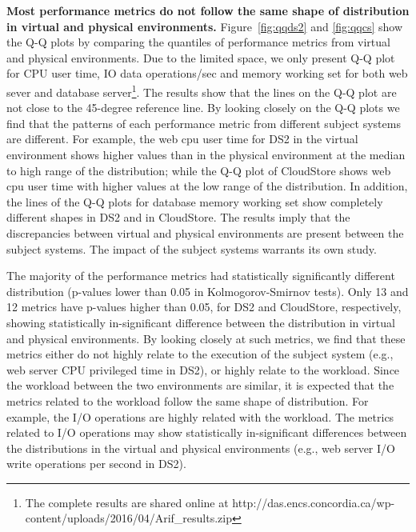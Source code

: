 \textbf{Most performance metrics do not follow the same shape of distribution in virtual and physical environments.} Figure~\ref{fig:qqds2} and \ref{fig:qqcs} show the Q-Q plots by comparing the quantiles of performance metrics from virtual and physical environments. Due to the limited space, we only present Q-Q plot for CPU user time, IO data operations/sec and memory working set for both web sever and database server\footnote{The complete results are shared online at http://das.encs.concordia.ca/wp-content/uploads/2016/04/Arif\_results.zip}. The results show that the lines on the Q-Q plot are not close to the 45-degree reference line. By looking closely on the Q-Q plots we find that the patterns of each performance metric from different subject systems are different. For example, the web cpu user time for DS2 in the virtual environment shows higher values than in the physical environment at the median to high range of the distribution; while the Q-Q plot of CloudStore shows web cpu user time with higher values at the low range of the distribution. In addition, the lines of the Q-Q plots for database memory working set show completely different shapes in DS2 and in CloudStore. The results imply that the discrepancies between virtual and physical environments are present between the subject systems. The impact of the subject systems warrants its own study.

The majority of the performance metrics had statistically significantly different distribution (p-values lower than 0.05 in Kolmogorov-Smirnov tests). Only 13 and 12 metrics have p-values higher than 0.05, for DS2 and CloudStore, respectively, showing statistically in-significant difference between the distribution in virtual and physical environments. By looking closely at such metrics, we find that these metrics either do not highly relate to the execution of the subject system (e.g., web server CPU privileged time in DS2), or highly relate to the workload. Since the workload between the two environments are similar, it is expected that the metrics related to the workload follow the same shape of distribution. For example, the I/O operations are highly related with the workload. The metrics related to I/O operations may show statistically in-significant differences between the distributions in the virtual and physical environments (e.g., web server I/O write operations per second in DS2). %


